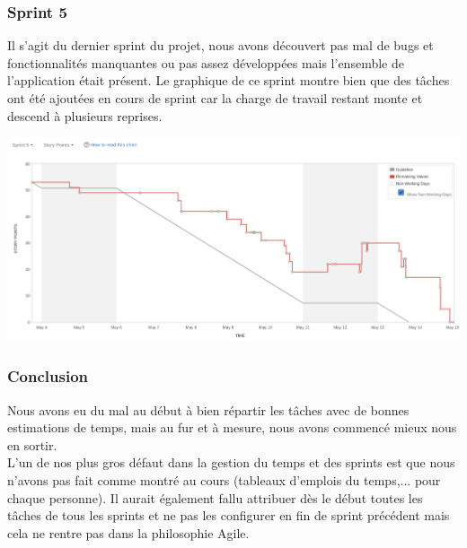 \documentclass[t, 12pt, usenames,dvipsnames]{article}
\begin{document}
        
            \subsubsection{Sprint 5}
                \noindent Il s'agit du dernier sprint du projet, nous avons découvert pas mal de bugs et fonctionnalités manquantes ou pas assez développées mais l'ensemble de l'application était présent. Le graphique de ce sprint montre bien que des tâches ont été ajoutées en cours de sprint car la charge de travail restant monte et descend à plusieurs reprises. 
                
                \begin{center}
                    \includegraphics[scale=.25]{images/graph-new/sprint5.png}
                    \label{fig:sprint5_graph}
                \end{center}
                
                
           \subsubsection{Conclusion} 
               \noindent Nous avons eu du mal au début à bien répartir les tâches avec de bonnes estimations de temps, mais au fur et à mesure, nous avons commencé mieux nous en sortir. \\
                L'un de nos plus gros défaut dans la gestion du temps et des sprints est que nous n'avons pas fait comme montré au cours (tableaux d'emplois du temps,... pour chaque personne). Il aurait également fallu attribuer dès le début toutes les tâches de tous les sprints et ne pas les configurer en fin de sprint précédent mais cela ne rentre pas dans la philosophie Agile. 
                
        
\end{document}
